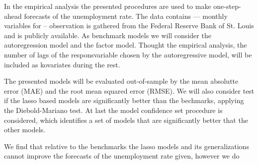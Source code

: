 In the empirical analysis the presented procedures are used to make one-step-ahead forecasts of the unemployment rate.
The data contains --- monthly variables for -- observation is gathered from the Federal Reserve Bank of St. Louis and is publicly available.
As benchmark models we will consider the autoregression model and the factor model.
Thought the empirical analysis, the number of lags of the responsvariable chosen by the autoregressive model, will be included as kovariates during the rest. 

The presented models will be evaluated out-of-sample by the mean absolutte error (MAE) and the root mean squared error (RMSE).
We will also consider test if the lasso based models are significantly better than the bechmarks, applying the Diebold-Mariano test.
At last the model confidence set procedure is considered, which identifies a set of models that are significantly better that the other models.

We find that relative to the benchmarks the lasso models and its generalizations cannot improve the forecasts of the unemployment rate given, however we do

